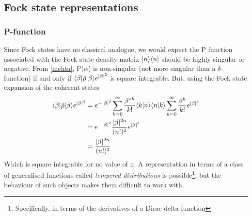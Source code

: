 \subsection{Fock state representations}
\subsubsection{P-function}
Since Fock states have no classical analogue, we would expect the P function associated with the Fock state density matrix $| n \rangle\langle n |$ should be highly singular or negative. From \ref{mehta}, P($\alpha$) is non-singular (not more singular than a $\delta$-function) if and only if $ \langle \beta | \hat{\rho} | \beta \rangle e^{|\beta|^2} $ is square integrable. But, using the Fock state expansion of the coherent states
\begin{align}
	 \langle \beta | \hat{\rho} | \beta \rangle e^{|\beta|^2}  &= e^{-|\beta|^2} \sum_{k=0}^\infty \frac {{\beta^*}^k}{k!} \langle k | n \rangle\langle n | k \rangle \sum_{k=0}^\infty \frac {\beta^k}{k!}e^{|\beta|^2} \\ &= e^{-|\beta|^2} \frac{|\beta|^{2n}}{(n!)^2} e^{|\beta|^2} \\ &= \frac{|\beta|^{2n}}{(n!)^2}
\end{align}
Which is square integrable for no value of n.
A representation in terms of a class of generalised functions called \emph{tempered distributions} is possible\footnote{Specifically, in terms of the derivatives of a Dirac delta function\autocite{Gerry2005}}, but the behaviour of such objects makes them difficult to work with.
